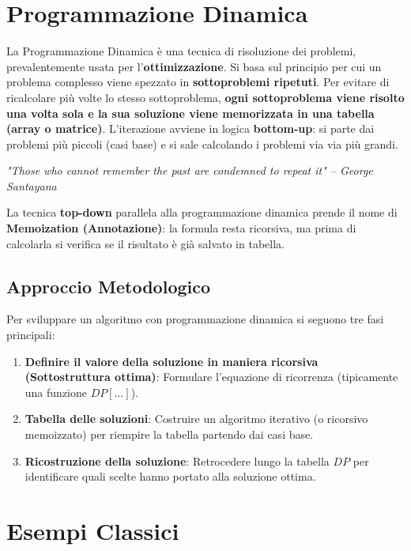 \documentclass[12pt, a4paper]{article}
\begin{document}
\section{Programmazione Dinamica}

\begin{tcolorbox}[colback=lightergray!10, colframe=tocsec, title=\textbf{Principi della Programmazione Dinamica}]
La Programmazione Dinamica è una tecnica di risoluzione dei problemi, prevalentemente usata per l'\textbf{ottimizzazione}.
Si basa sul principio per cui un problema complesso viene spezzato in \textbf{sottoproblemi ripetuti}. Per evitare di ricalcolare più volte lo stesso sottoproblema, \textbf{ogni sottoproblema viene risolto una volta sola e la sua soluzione viene memorizzata in una tabella (array o matrice)}.
L'iterazione avviene in logica \textbf{bottom-up}: si parte dai problemi più piccoli (casi base) e si sale calcolando i problemi via via più grandi.
\end{tcolorbox}
\textit{"Those who cannot remember the past are condemned to repeat it" – George Santayana}

La tecnica \textbf{top-down} parallela alla programmazione dinamica prende il nome di \textbf{Memoization (Annotazione)}: la formula resta ricorsiva, ma prima di calcolarla si verifica se il risultato è già salvato in tabella.

\subsection{Approccio Metodologico}
Per sviluppare un algoritmo con programmazione dinamica si seguono tre fasi principali:
\begin{enumerate}
\item \textbf{Definire il valore della soluzione in maniera ricorsiva (Sottostruttura ottima)}: Formulare l'equazione di ricorrenza (tipicamente una funzione $DP[\dots]$).
\item \textbf{Tabella delle soluzioni}: Costruire un algoritmo iterativo (o ricorsivo memoizzato) per riempire la tabella partendo dai casi base.
\item \textbf{Ricostruzione della soluzione}: Retrocedere lungo la tabella $DP$ per identificare quali scelte hanno portato alla soluzione ottima.
\end{enumerate}

\newpage

\section{Esempi Classici}
\end{document}
